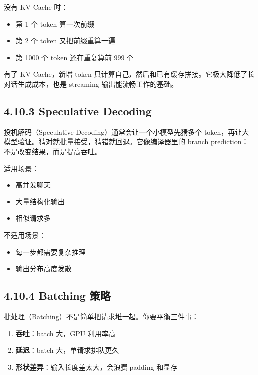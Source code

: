 没有 KV Cache 时：


\begin{itemize}[leftmargin=2em]
\item 第 1 个 token 算一次前缀
\item 第 2 个 token 又把前缀重算一遍
\item 第 1000 个 token 还在重复算前 999 个
\end{itemize}

有了 KV Cache，新增 token 只计算自己，然后和已有缓存拼接。它极大降低了长对话生成成本，也是 streaming 输出能流畅工作的基础。


\subsection{4.10.3 Speculative Decoding}

投机解码（Speculative Decoding）通常会让一个小模型先猜多个 token，再让大模型验证。猜对就批量接受，猜错就回退。它像编译器里的 branch prediction：不是改变结果，而是提高吞吐。


适用场景：


\begin{itemize}[leftmargin=2em]
\item 高并发聊天
\item 大量结构化输出
\item 相似请求多
\end{itemize}

不适用场景：


\begin{itemize}[leftmargin=2em]
\item 每一步都需要复杂推理
\item 输出分布高度发散
\end{itemize}

\subsection{4.10.4 Batching 策略}

批处理（Batching）不是简单把请求堆一起。你要平衡三件事：


\begin{enumerate}[leftmargin=2em]
\item \textbf{吞吐}：batch 大，GPU 利用率高
\item \textbf{延迟}：batch 大，单请求排队更久
\item \textbf{形状差异}：输入长度差太大，会浪费 padding 和显存
\end{enumerate}

